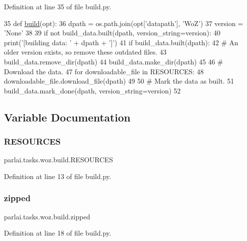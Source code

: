 Definition at line 35 of file build.\+py.


\begin{DoxyCode}
35 \textcolor{keyword}{def }\hyperlink{namespacedialog__babi__feedback_1_1build_a7a9d289f7493a5ded13c4b7f071b6184}{build}(opt):
36     dpath = os.path.join(opt[\textcolor{stringliteral}{'datapath'}], \textcolor{stringliteral}{'WoZ'})
37     version = \textcolor{stringliteral}{'None'}
38 
39     \textcolor{keywordflow}{if} \textcolor{keywordflow}{not} build\_data.built(dpath, version\_string=version):
40         print(\textcolor{stringliteral}{'[building data: '} + dpath + \textcolor{stringliteral}{']'})
41         \textcolor{keywordflow}{if} build\_data.built(dpath):
42             \textcolor{comment}{# An older version exists, so remove these outdated files.}
43             build\_data.remove\_dir(dpath)
44         build\_data.make\_dir(dpath)
45 
46         \textcolor{comment}{# Download the data.}
47         \textcolor{keywordflow}{for} downloadable\_file \textcolor{keywordflow}{in} RESOURCES:
48             downloadable\_file.download\_file(dpath)
49 
50     \textcolor{comment}{# Mark the data as built.}
51     build\_data.mark\_done(dpath, version\_string=version)
52 \end{DoxyCode}


\subsection{Variable Documentation}
\mbox{\label{namespaceparlai_1_1tasks_1_1woz_1_1build_a5cef39ffd42686f4cc8c6a5e5fa120e2}} 
\subsubsection{\texorpdfstring{R\+E\+S\+O\+U\+R\+C\+ES}{RESOURCES}}
{\footnotesize\ttfamily parlai.\+tasks.\+woz.\+build.\+R\+E\+S\+O\+U\+R\+C\+ES}



Definition at line 13 of file build.\+py.

\mbox{\label{namespaceparlai_1_1tasks_1_1woz_1_1build_aba5672ed5fa36cb7f66f392d23fb9f0e}} 
\subsubsection{\texorpdfstring{zipped}{zipped}}
{\footnotesize\ttfamily parlai.\+tasks.\+woz.\+build.\+zipped}



Definition at line 18 of file build.\+py.

